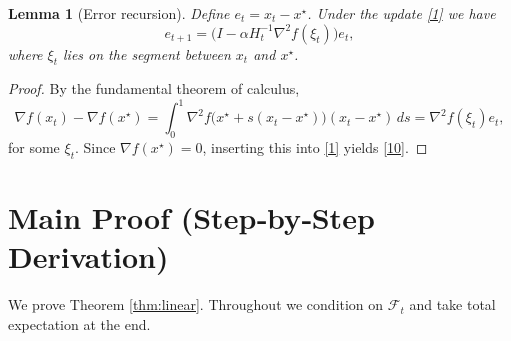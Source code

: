 \documentclass{article}
\newtheorem{lemma}{Lemma}
\begin{document}
\begin{lemma}[Error recursion]\label{lem:recursion}
Define $e_{t}=x_{t}-x^{\star}$.  Under the update \eqref{1} we have
\[
e_{t+1}= \big(I-\alpha H_{t}^{-1}\nabla^{2}f(\xi_{t})\big)e_{t},
\tag{10}
\]
where $\xi_{t}$ lies on the segment between $x_{t}$ and $x^{\star}$.
\end{lemma}
\begin{proof}
By the fundamental theorem of calculus,
\[
\nabla f(x_{t})-\nabla f(x^{\star})
      =\int_{0}^{1}\nabla^{2}f\!\big(x^{\star}+s(x_{t}-x^{\star})\big)(x_{t}-x^{\star})\,ds
      =\nabla^{2}f(\xi_{t})e_{t},
\]
for some $\xi_{t}$.  Since $\nabla f(x^{\star})=0$, inserting this into \eqref{1} yields \eqref{10}. \qedhere
\end{proof}

\section*{Main Proof (Step‑by‑Step Derivation)}
We prove Theorem \ref{thm:linear}.  Throughout we condition on $\mathcal{F}_{t}$ and take total expectation at the end.
\end{document}
